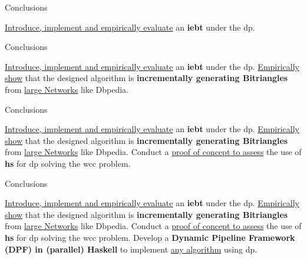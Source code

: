 \begin{frame}[fragile]{Conclusions}
  \begin{itemize}
    \itemcheck \underline{\color{blue}Introduce, implement and empirically evaluate} an \textbf{\acrlong{iebt}} under the \acrlong{dp}.
  \end{itemize}
\end{frame}

\begin{frame}[fragile]{Conclusions}
  \begin{itemize}
    \setlength\itemsep{1.5em}
    \itemcheck \underline{\color{blue}Introduce, implement and empirically evaluate} an \textbf{\acrlong{iebt}} under the \acrlong{dp}.
    \itemcheck \underline{\color{blue}Empirically show} that the designed algorithm is \textbf{incrementally generating Bitriangles} from \underline{\color{blue}large Networks} like Dbpedia. 
  \end{itemize}
\end{frame}

\begin{frame}[fragile]{Conclusions}
  \begin{itemize}
    \setlength\itemsep{1.5em}
    \itemcheck \underline{\color{blue}Introduce, implement and empirically evaluate} an \textbf{\acrlong{iebt}} under the \acrlong{dp}.
    \itemcheck \underline{\color{blue}Empirically show} that the designed algorithm is \textbf{incrementally generating Bitriangles} from \underline{\color{blue}large Networks} like Dbpedia. 
    \itemcheck Conduct a \underline{\color{blue}proof of concept to assess} the use of \textbf{\acrshort{hs}} for \acrlong{dp} solving the \acrlong{wcc} problem.
  \end{itemize}
\end{frame}

\begin{frame}[fragile]{Conclusions}
  \begin{itemize}
    \setlength\itemsep{1.5em}
    \itemcheck \underline{\color{blue}Introduce, implement and empirically evaluate} an \textbf{\acrlong{iebt}} under the \acrlong{dp}.
    \itemcheck \underline{\color{blue}Empirically show} that the designed algorithm is \textbf{incrementally generating Bitriangles} from \underline{\color{blue}large Networks} like Dbpedia. 
    \itemcheck Conduct a \underline{\color{blue}proof of concept to assess} the use of \textbf{\acrshort{hs}} for \acrlong{dp} solving the \acrlong{wcc} problem.
    \itemcheck Develop a \textbf{Dynamic Pipeline Framework (DPF) in (parallel) Haskell} to implement \underline{\color{blue}any algorithm} using \acrlong{dp}.
  \end{itemize}
\end{frame}


